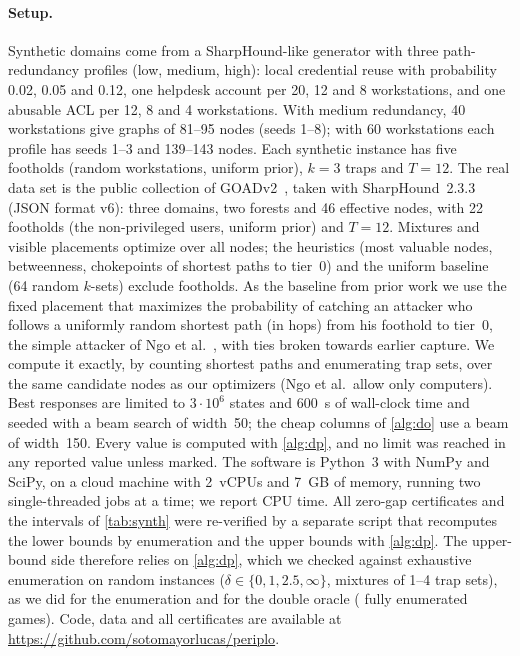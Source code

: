 \documentclass[runningheads]{llncs}
\begin{document}
\paragraph{Setup.}
Synthetic domains come from a SharpHound-like generator with three path-redundancy profiles (low, medium, high): local credential reuse with probability 0.02, 0.05 and 0.12, one helpdesk account per 20, 12 and 8 workstations, and one abusable ACL per 12, 8 and 4 workstations. With medium redundancy, 40 workstations give graphs of 81--95 nodes (seeds 1--8); with 60 workstations each profile has seeds 1--3 and 139--143 nodes. Each synthetic instance has five footholds (random workstations, uniform prior), $k=3$ traps and $T=12$. The real data set is the public collection of GOADv2~\cite{goad,bhsample}, taken with SharpHound~2.3.3 (JSON format v6): three domains, two forests and 46 effective nodes, with 22 footholds (the non-privileged users, uniform prior) and $T=12$. Mixtures and visible placements optimize over all nodes; the heuristics (most valuable nodes, betweenness, chokepoints of shortest paths to tier~0) and the uniform baseline (64 random $k$-sets) exclude footholds. As the baseline from prior work we use the fixed placement that maximizes the probability of catching an attacker who follows a uniformly random shortest path (in hops) from his foothold to tier~0, the simple attacker of Ngo et al.~\cite{ngo2024catch}, with ties broken towards earlier capture. We compute it exactly, by counting shortest paths and enumerating trap sets, over the same candidate nodes as our optimizers (Ngo et al.\ allow only computers). Best responses are limited to $3\cdot10^6$ states and 600~s of wall-clock time and seeded with a beam search of width~50; the cheap columns of \cref{alg:do} use a beam of width~150. Every value is computed with \cref{alg:dp}, and no limit was reached in any reported value unless marked. The software is Python~3 with NumPy and SciPy, on a cloud machine with 2~vCPUs and 7~GB of memory, running two single-threaded jobs at a time; we report CPU time. All \NCert{} zero-gap certificates and the \NInterval{} intervals of \cref{tab:synth} were re-verified by a separate script that recomputes the lower bounds by enumeration and the upper bounds with \cref{alg:dp}. The upper-bound side therefore relies on \cref{alg:dp}, which we checked against exhaustive enumeration on \NTestExact{} random instances ($\delta\in\{0,1,2.5,\infty\}$, mixtures of 1--4 trap sets), as we did for the enumeration and for the double oracle (\NTestGame{} fully enumerated games). Code, data and all certificates are available at \url{https://github.com/sotomayorlucas/periplo}.
\end{document}
